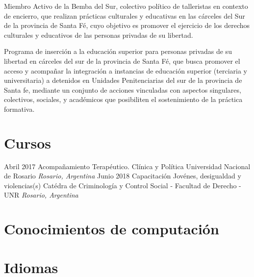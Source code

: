 \documentclass[11pt,a4paper,sans]{moderncv}        %
\begin{document}
\vspace{2mm}

  {
    Miembro Activo de la Bemba del Sur, colectivo político de talleristas en contexto de encierro, que realizan prácticas culturales y educativas en las cárceles del Sur de la provincia de Santa Fé, cuyo objetivo es promover el ejercicio de los derechos culturales y educativos de las personas privadas de su libertad.
  }

\vspace{2mm}

  {
    Programa de inserción a la educación superior para personas privadas de su libertad en cárceles del sur de la provincia de Santa Fé, que busca promover el acceso y acompañar la integración a instancias de educación superior (terciaria y universitaria) a detenidos en Unidades Penitenciarias del sur de la provincia de Santa fe, mediante un conjunto de acciones vinculadas con aspectos singulares, colectivos, sociales, y académicos que posibiliten el sostenimiento de la práctica formativa.
  }

\vspace{2mm}

\section{Cursos}
\cventry
{Abril 2017}
{Acompañamiento Terap\'eutico. Clínica y Política}
{Universidad Nacional de Rosario}
{}
{\textit{Rosario, Argentina}}
{}
\cventry
{Junio 2018}
{Capacitación Jovénes, desigualdad y violencias(s)}
{Catédra de Criminología y Control Social - Facultad de Derecho - UNR}
{}
{\textit{Rosario, Argentina}}
{}
\vspace{2mm}

\section{Conocimientos de computaci\'on}
\vspace{2mm}

\section{Idiomas}

\vspace{2mm}

\end{document}
